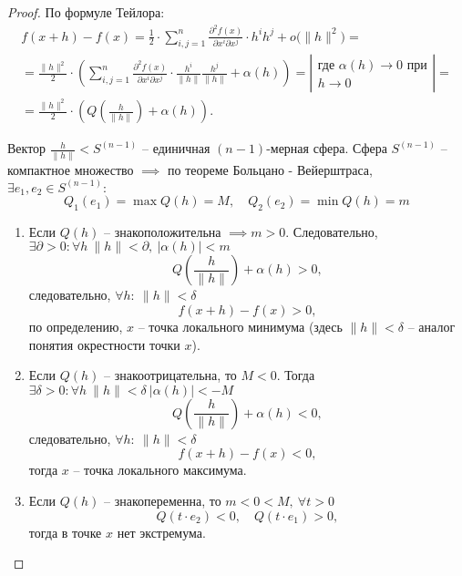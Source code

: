 \begin{proof}
    По формуле Тейлора:
    \begin{multline*}
        f(x+h) - f(x) = \frac{1}{2}\cdot \sum_{i,j=1}^{n}\frac{\partial^2f(x)}{\partial x^i \partial x^j}\cdot h^ih^j + o\big(\|h\|^2\big) = \\
        = \frac{\|h\|^2}{2}\cdot\left(\sum_{i,j=1}^{n}\frac{\partial^2f(x)}{\partial x^i\partial x^j}\cdot \frac{h^i}{\|h\|}\frac{h^j}{\|h\|} + \alpha(h)\right) = \left|\begin{array}{c}
            \text{где }\alpha(h)\rightarrow 0\text{ при} \\
            h \rightarrow 0
        \end{array}\right| = \\
        = \frac{\|h\|^2}{2}\cdot\left(Q\left(\frac{h}{\|h\|}\right) + \alpha(h)\right).
    \end{multline*}

    Вектор $\frac{h}{\|h\|} < S^{(n-1)}$ -- единичная $(n-1)$-мерная сфера. Сфера $S^{(n-1)}$ -- компактное множество $\implies$ по теореме Больцано - Вейерштраса, $\exists e_1,e_2 \in S^{(n-1)}:$
    \[
        Q_1(e_1) = \max Q(h) = M, \quad Q_2(e_2) = \min Q(h) = m
    \]

    \begin{enumerate}
        \item Если $Q(h)$ -- знакоположительна $\implies m > 0$. Следовательно, $ \exists \partial > 0: \forall h \ \|h\| < \partial, \ |\alpha(h)| < m $
              \[
                  Q\left(\frac{h}{\|h\|}\right) + \alpha(h) > 0,
              \] следовательно, $ \forall h: \ \|h\| < \delta $
              \[
                  f(x+h) - f(x) > 0,
              \] по определению, $x$ -- точка локального минимума (здесь $\|h\| < \delta$ -- аналог понятия окрестности точки $x$).
        \item Если $Q(h)$ -- знакоотрицательна, то $M < 0$. Тогда $ \exists \delta > 0: \forall h \ \|h\| < \delta \ |\alpha(h)| < -M$
              \[
                  Q\left(\frac{h}{\|h\|}\right) + \alpha(h) < 0,
              \] следовательно, $ \forall h: \ \|h\| < \delta $
              \[
                  f(x+h) - f(x) < 0,
              \] тогда $ x $ -- точка локального максимума.
        \item Если $Q(h)$ -- знакопеременна, то $m < 0 < M, \ \forall t > 0$
              \[
                  Q(t\cdot e_2) < 0, \quad Q(t \cdot e_1) > 0,
              \] тогда в точке $x$ нет экстремума.
    \end{enumerate}
\end{proof}

